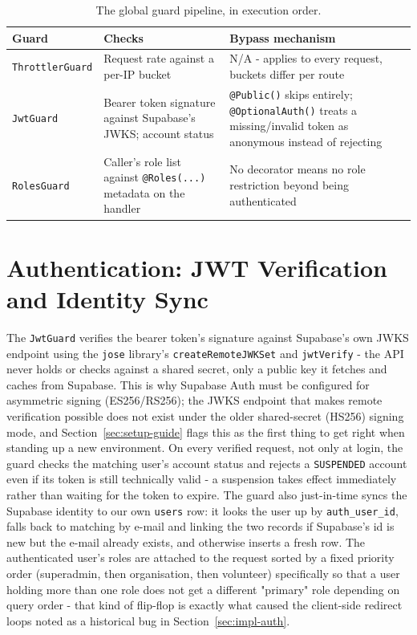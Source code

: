 \begin{table}[H]\centering
\caption{The global guard pipeline, in execution order.}
\label{tab:guard-pipeline}
\begin{tabularx}{\textwidth}{|p{}|p{}|Y|}
\hline
\textbf{Guard} & \textbf{Checks} & \textbf{Bypass mechanism}\\\hline
\texttt{ThrottlerGuard} & Request rate against a per-IP bucket & N/A - applies to every request, buckets differ per route\\\hline
\texttt{JwtGuard} & Bearer token signature against Supabase's JWKS; account status & \texttt{@Public()} skips entirely; \texttt{@OptionalAuth()} treats a missing/invalid token as anonymous instead of rejecting\\\hline
\texttt{RolesGuard} & Caller's role list against \texttt{@Roles(...)} metadata on the handler & No decorator means no role restriction beyond being authenticated\\\hline
\end{tabularx}
\end{table}

\section{Authentication: JWT Verification and Identity Sync}
\label{sec:jwt-internals}
The \texttt{JwtGuard} verifies the bearer token's signature against Supabase's own JWKS endpoint using the \texttt{jose} library's \texttt{createRemoteJWKSet} and \texttt{jwtVerify} - the API never holds or checks against a shared secret, only a public key it fetches and caches from Supabase. This is why Supabase Auth must be configured for asymmetric signing (ES256/RS256); the JWKS endpoint that makes remote verification possible does not exist under the older shared-secret (HS256) signing mode, and Section~\ref{sec:setup-guide} flags this as the first thing to get right when standing up a new environment.
\clearpage
\noindent On every verified request, not only at login, the guard checks the matching user's account status and rejects a \texttt{SUSPENDED} account even if its token is still technically valid - a suspension takes effect immediately rather than waiting for the token to expire. The guard also just-in-time syncs the Supabase identity to our own \texttt{users} row: it looks the user up by \texttt{auth\_user\_id}, falls back to matching by e-mail and linking the two records if Supabase's id is new but the e-mail already exists, and otherwise inserts a fresh row. The authenticated user's roles are attached to the request sorted by a fixed priority order (superadmin, then organisation, then volunteer) specifically so that a user holding more than one role does not get a different "primary" role depending on query order - that kind of flip-flop is exactly what caused the client-side redirect loops noted as a historical bug in Section~\ref{sec:impl-auth}.

